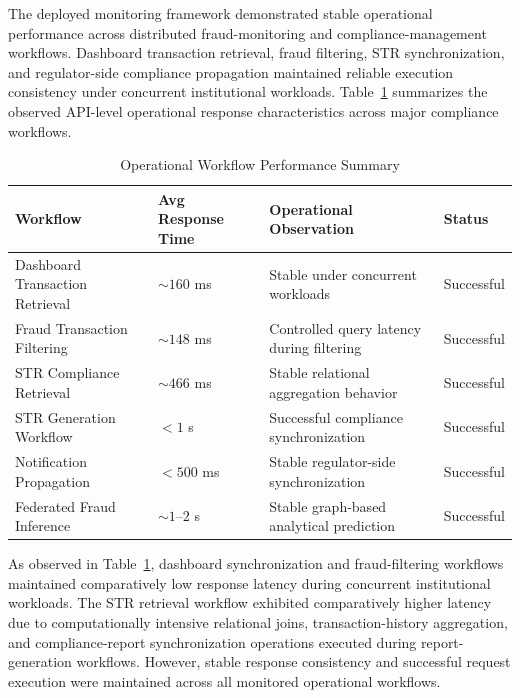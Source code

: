 The deployed monitoring framework demonstrated stable operational performance across distributed fraud-monitoring and compliance-management workflows. Dashboard transaction retrieval, fraud filtering, STR synchronization, and regulator-side compliance propagation maintained reliable execution consistency under concurrent institutional workloads. Table~\ref{tab:operational_metrics} summarizes the observed API-level operational response characteristics across major compliance workflows.

\begin{table}[H]
\centering
\caption{Operational Workflow Performance Summary}
\vspace{0.2cm}

\renewcommand{\arraystretch}{1.3}

\begin{tabular}{|p{4.5cm}|p{2.5cm}|p{2.8cm}|p{2.3cm}|}
\hline
\textbf{Workflow} & \textbf{Avg Response Time} & \textbf{Operational Observation} & \textbf{Status} \\ \hline

Dashboard Transaction Retrieval
& $\sim160$ ms
& Stable under concurrent workloads
& Successful \\ \hline

Fraud Transaction Filtering
& $\sim148$ ms
& Controlled query latency during filtering
& Successful \\ \hline

STR Compliance Retrieval
& $\sim466$ ms
& Stable relational aggregation behavior
& Successful \\ \hline

STR Generation Workflow
& $<1$ s
& Successful compliance synchronization
& Successful \\ \hline

Notification Propagation
& $<500$ ms
& Stable regulator-side synchronization
& Successful \\ \hline

Federated Fraud Inference
& $\sim1$--$2$ s
& Stable graph-based analytical prediction
& Successful \\ \hline

\end{tabular}

\renewcommand{\arraystretch}{1}

\label{tab:operational_metrics}
\end{table}

As observed in Table~\ref{tab:operational_metrics}, dashboard synchronization and fraud-filtering workflows maintained comparatively low response latency during concurrent institutional workloads. The STR retrieval workflow exhibited comparatively higher latency due to computationally intensive relational joins, transaction-history aggregation, and compliance-report synchronization operations executed during report-generation workflows. However, stable response consistency and successful request execution were maintained across all monitored operational workflows.

